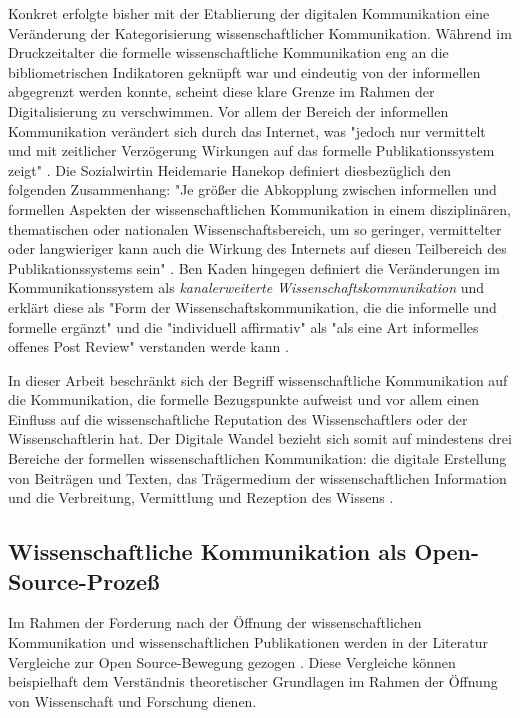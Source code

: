 Konkret erfolgte bisher mit der Etablierung der digitalen Kommunikation eine Veränderung der Kategorisierung wissenschaftlicher Kommunikation. Während im Druckzeitalter die formelle wissenschaftliche Kommunikation eng an die bibliometrischen Indikatoren geknüpft war und eindeutig von der informellen abgegrenzt werden konnte, scheint diese klare Grenze im Rahmen der Digitalisierung zu verschwimmen. Vor allem der Bereich der informellen Kommunikation verändert sich durch das Internet, was "jedoch nur vermittelt und mit zeitlicher Verzögerung Wirkungen auf das formelle Publikationssystem zeigt" \cite{Hanekop_2014}. Die Sozialwirtin Heidemarie Hanekop definiert diesbezüglich den folgenden Zusammenhang: "Je größer die Abkopplung zwischen informellen und formellen Aspekten der wissenschaftlichen Kommunikation in einem disziplinären, thematischen oder nationalen Wissenschaftsbereich, um so geringer, vermittelter oder langwieriger kann auch die Wirkung des Internets auf diesen Teilbereich des Publikationssystems sein" \cite{Hanekop_2014}. Ben Kaden hingegen definiert die Veränderungen im Kommunikationssystem als \textit{kanalerweiterte Wissenschaftskommunikation} und erklärt diese als "Form der Wissenschaftskommunikation, die die informelle und formelle ergänzt" und die "individuell affirmativ" als "als eine Art informelles offenes Post Review" verstanden werde kann \cite{kaden_2009_library}.

In dieser Arbeit beschränkt sich der Begriff wissenschaftliche Kommunikation auf die Kommunikation, die formelle Bezugspunkte aufweist und vor allem einen Einfluss auf die wissenschaftliche Reputation des Wissenschaftlers oder der Wissenschaftlerin hat. Der Digitale Wandel bezieht sich somit auf mindestens drei Bereiche der formellen wissenschaftlichen Kommunikation: die digitale Erstellung von Beiträgen und Texten, das Trägermedium der wissenschaftlichen Information und die Verbreitung, Vermittlung und Rezeption des Wissens \cite{bbaw_publizieren_2015}.

\subsection{Wissenschaftliche Kommunikation als Open-Source-Prozeß}
Im Rahmen der Forderung nach der Öffnung der wissenschaftlichen Kommunikation und wissenschaftlichen Publikationen werden in der Literatur Vergleiche zur Open Source-Bewegung gezogen \cite{Peters_2014}. Diese Vergleiche können beispielhaft dem Verständnis theoretischer Grundlagen im Rahmen der Öffnung von Wissenschaft und Forschung dienen.

